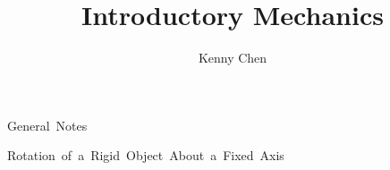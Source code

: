 \documentclass[12pt]{report}
\title{Introductory Mechanics}
\author{Kenny Chen}
\begin{document}
\maketitle
\tableofcontents
\newpage

\unit{General Notes}

\unit{Rotation of a Rigid Object About a Fixed Axis}


\end{document}

